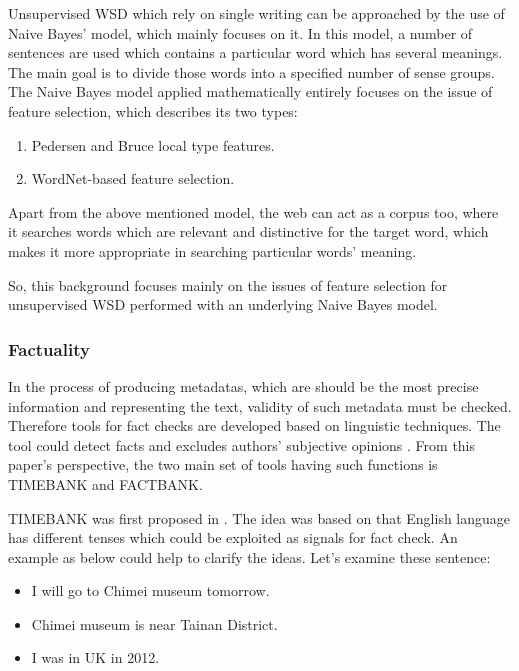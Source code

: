 Unsupervised WSD which rely on single writing can be approached by the use of Naive Bayes' model, which mainly focuses on it. In this model, a number of sentences are used which contains a particular word which has several meanings. The main goal is to divide those words into a specified number of sense groups.
The Naive Bayes model applied mathematically entirely focuses on the issue of feature selection, which describes its two types:

\begin{enumerate}
	\item Pedersen and Bruce local type features.
	\item WordNet-based feature selection.
\end{enumerate}

Apart from the above mentioned model, the web can act as a corpus too, where it searches words which are relevant and distinctive for the target word, which makes it more appropriate in searching particular words' meaning.

So, this background focuses mainly on the issues of feature selection for unsupervised WSD performed with an underlying Naive Bayes model.


\subsubsection*{Factuality}
In the process of producing metadatas, which are should be the most precise information and representing the text, validity of such metadata must be checked. Therefore tools for fact checks are developed based on linguistic techniques.  The tool could detect facts and excludes authors' subjective opinions \cite{agerri2015big}. From this paper's perspective, the two main set of tools having such functions is TIMEBANK and FACTBANK.

TIMEBANK was first proposed in \cite{pustejovsky2003timebank}. The idea was based on that English language has different tenses which could be exploited as signals for fact check. An example as below could help to clarify the ideas. Let's examine these sentence:

\begin{itemize}
	\item I will go to Chimei museum tomorrow.
	\item Chimei museum is near Tainan District.
	\item I was in UK in 2012.
\end{itemize}

